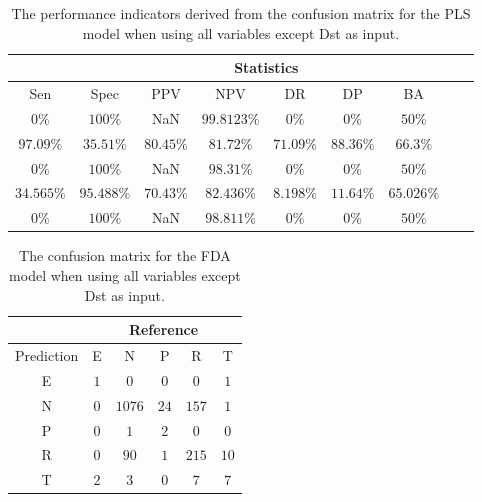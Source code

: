 \begin{table}[!ht]
	\centering
	\begin{tabular}{|c|c|c|c|c|c|c|c|c|}
		\hline
		 & \multicolumn{7}{c|}{Statistics} \\ \hline
		Sen & Spec & PPV & NPV & DR & DP & BA \\ \hline
		$0\%$ & $100\%$ & NaN & $99.8123\%$ & $0\%$ & $0\%$ & $50\%$ \\ \hline
		$97.09\%$ & $35.51\%$ & $80.45\%$ & $81.72\%$ & $71.09\%$ & $88.36\%$ & $66.3\%$ \\ \hline
		$0\%$ & $100\%$ & NaN & $98.31\%$ & $0\%$ & $0\%$ & $50\%$ \\ \hline
		$34.565\%$ & $95.488\%$ & $70.43\%$ & $82.436\%$ & $8.198\%$ & $11.64\%$ & $65.026\%$ \\ \hline
		$0\%$ & $100\%$ & NaN & $98.811\%$ & $0\%$ & $0\%$ & $50\%$ \\ \hline
	\end{tabular}
	\caption{The performance indicators derived from the confusion matrix for the PLS model when using all variables except Dst as input.}
	\label{tab:cs:noDst:pls}
\end{table}

\begin{table}[!ht]
	\centering
	\begin{tabular}{|c|c|c|c|c|c|}
		\hline
		 & \multicolumn{5}{|c|}{Reference} \\ \hline
		 Prediction & E & N & P & R & T \\ \hline
		 E & $1$ & $0$ & $0$ & $0$ & $1$ \\ \hline
		 N & $0$ & $1076$ & $24$ & $157$ & $1$ \\ \hline
		 P & $0$ & $1$ & $2$ & $0$ & $0$ \\ \hline
		 R & $0$ & $90$ & $1$ & $215$ & $10$ \\ \hline
		 T & $2$ & $3$ & $0$ & $7$ & $7$ \\ \hline
	\end{tabular}
	\caption{The confusion matrix for the FDA model when using all variables except Dst as input.}
	\label{tab:cm:noDst:fda}
\end{table}

